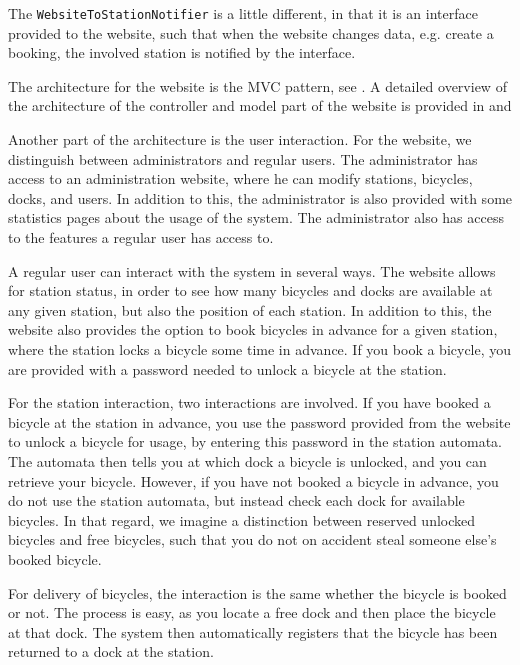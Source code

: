 The \texttt{WebsiteToStationNotifier} is a little different, in that it is an interface provided to the website, such that when the website changes data, e.g. create a booking, the involved station is notified by the interface.

The architecture for the website is the MVC pattern, see .
A detailed overview of the architecture of the controller and model part of the website is provided in  and 

Another part of the architecture is the user interaction.
For the website, we distinguish between administrators and regular users.
The administrator has access to an administration website, where he can modify stations, bicycles, docks, and users.
In addition to this, the administrator is also provided with some statistics pages about the usage of the system.
The administrator also has access to the features a regular user has access to.

A regular user can interact with the system in several ways.
The website allows for station status, in order to see how many bicycles and docks are available at any given station, but also the position of each station.
In addition to this, the website also provides the option to book bicycles in advance for a given station, where the station locks a bicycle some time in advance.
If you book a bicycle, you are provided with a password needed to unlock a bicycle at the station.

For the station interaction, two interactions are involved.
If you have booked a bicycle at the station in advance, you use the password provided from the website to unlock a bicycle for usage, by entering this password in the station automata.
The automata then tells you at which dock a bicycle is unlocked, and you can retrieve your bicycle.
However, if you have not booked a bicycle in advance, you do not use the station automata, but instead check each dock for available bicycles.
In that regard, we imagine a distinction between reserved unlocked bicycles and free bicycles, such that you do not on accident steal someone else's booked bicycle.

For delivery of bicycles, the interaction is the same whether the bicycle is booked or not.
The process is easy, as you locate a free dock and then place the bicycle at that dock.
The system then automatically registers that the bicycle has been returned to a dock at the station.


